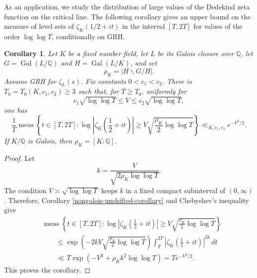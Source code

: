 \documentclass[twoside,reqno,11pt,a4paper]{amsart}
\numberwithin{equation}{section}
\theoremstyle{plain}
\newtheorem{cor}[thm]{Corollary}
\theoremstyle{definition}
\theoremstyle{remark}
\DeclareMathOperator{\Gal}{Gal}
\renewcommand{\le}{\leqslant}
\renewcommand{\ge}{\geqslant}
\begin{document}
	    As an application, we study the distribution of large values of the Dedekind zeta function on the critical line. The following corollary gives an upper bound on the measure of level sets of $\zeta_K(1/2+it)$ in the interval $[T,2T]$ for values of the order $\log\log T$, conditionally on GRH.

\begin{cor}\label{large-deviation-nongalois}
Let $K$ be a fixed number field, let $L$ be its Galois closure over $\mathbb Q$, let $G=\Gal(L/\mathbb Q)$ and $H=\Gal(L/K)$, and set
\begin{equation*}
        \rho_K=|H\backslash G/H|.
\end{equation*}
Assume GRH for $\zeta_L(s)$. Fix constants $0<c_1<c_2$. There is $T_0=T_0(K,c_1,c_2)\ge3$ such that, for $T\ge T_0$, uniformly for
\begin{equation*}
        c_1\sqrt{\log\log T}\le  V\le  c_2\sqrt{\log\log T},
\end{equation*}
one has
\begin{equation*}
        \frac1T\operatorname{meas}\left\{
        t\in[T,2T]:
        \log\left|\zeta_K\left(\frac12+it\right)\right|
        \ge
        V\sqrt{\frac{\rho_K}{2}\log\log T}
        \right\}
        \ll_{K,c_1,c_2}
        e^{-V^2/2}.
\end{equation*}
If $K/\mathbb Q$ is Galois, then $\rho_K=[K:\mathbb Q]$.
\end{cor}
\begin{proof}
Let
\begin{equation*}
        k=\frac{V}{\sqrt{2\rho_K\log\log T}}.
\end{equation*}
The condition $V\asymp\sqrt{\log\log T}$ keeps $k$ in a fixed compact subinterval of $(0,\infty)$.  Therefore, Corollary \ref{nongalois-unshifted-corollary} and Chebyshev's inequality give
\begin{align*}
&\operatorname{meas}\left\{
        t\in[T,2T]:
        \log\left|\zeta_K\left(\frac12+it\right)\right|
        \ge
        V\sqrt{\frac{\rho_K}{2}\log\log T}
        \right\} \\
&\qquad\le
        \exp\left(-2k V\sqrt{\frac{\rho_K}{2}\log\log T}\right)
        \int_T^{2T}
        \left|\zeta_K\left(\frac12+it\right)\right|^{2k}\,dt  \\
&\qquad\ll
        T\exp\left(-V^2+\rho_Kk^2\log\log T\right)
        =
        T e^{-V^2/2}.
\end{align*}
This proves the corollary. 
\end{proof}
\end{document}
